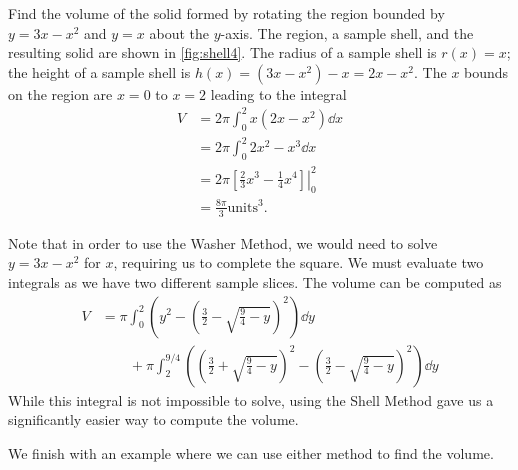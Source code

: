 \begin{example}\label{ex_shell4}%
Find the volume of the solid formed by rotating the region bounded by $y=3x-x^2$ and $y=x$ about the $y$-axis.
\solution
The region, a sample shell, and the resulting solid are shown in \autoref{fig:shell4}. The radius of a sample shell is $r(x)=x$; the height of a sample shell is $h(x)=(3x-x^2)-x=2x-x^2$. The $x$ bounds on the region are $x=0$ to $x=2$ leading to the integral
\begin{align*}
V&=2\pi \int_0^2 x(2x-x^2) \dd x\\
&=2\pi \int_0^2 2x^2-x^3 \dd x\\
&=2\pi \left.\left[ \frac23 x^3-\frac14 x^4 \right] \right|_0^2\\
&=\frac{8\pi}{3} \text{units}^3.
\end{align*}

Note that in order to use the Washer Method, we would need to solve $y=3x-x^2$ for $x$, requiring us to complete the square. We must evaluate two integrals as we have two different sample slices. The volume can be computed as 
\begin{align*}
V&=\pi\int_0^2\left(y^2-\left(\frac32-\sqrt{\frac94 -y}\right)^2\right)\dd y \\
&\qquad+\pi\int_2^{9/4}\left(\left(\frac32+\sqrt{\frac94 -y}\right)^2
-\left(\frac32-\sqrt{\frac94 -y}\right)^2\right)\dd y
\end{align*}
While this integral is not impossible to solve, using the Shell Method gave us a significantly easier way to compute the volume.
\end{example}

We finish with an example where we can use either method to find the volume.

